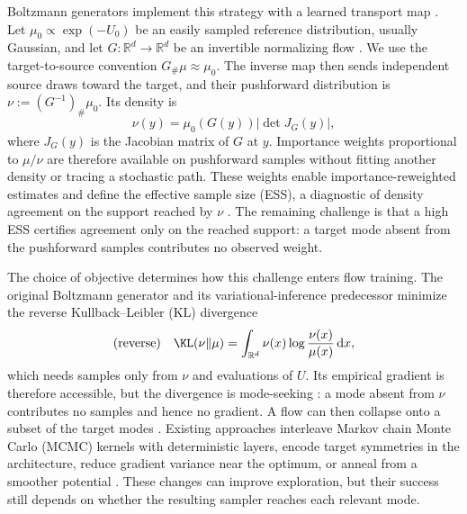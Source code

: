 \documentclass{article}
\begin{document}
Boltzmann generators implement this strategy with a learned transport map \citep{noe2019boltzmann}. Let $\mu_0\propto\exp(-U_0)$ be an easily sampled reference distribution, usually Gaussian, and let $G:\mathbb R^d\to\mathbb R^d$ be an invertible normalizing flow \citep{rezende2015variational,papamakarios2017masked,kingma2018glow}. We use the target-to-source convention $G_{\#}\mu\approx\mu_0$. The inverse map then sends independent source draws toward the target, and their pushforward distribution is $\nu:=(G^{-1})_{\#}\mu_0$. Its density is
\begin{equation}
    \nu(y)=\mu_0(G(y))\left|\det J_G(y)\right|,
    \label{eq: pushforward-density}
\end{equation}
where $J_G(y)$ is the Jacobian matrix of $G$ at $y$. Importance weights proportional to $\mu/\nu$ are therefore available on pushforward samples without fitting another density or tracing a stochastic path. These weights enable importance-reweighted estimates and define the effective sample size (ESS), a diagnostic of density agreement on the support reached by $\nu$ \citep{liu2001monte,doucet2001introduction,martino2017rethinking}. The remaining challenge is that a high ESS certifies agreement only on the reached support: a target mode absent from the pushforward samples contributes no observed weight.

The choice of objective determines how this challenge enters flow training. The original Boltzmann generator \citep{noe2019boltzmann} and its variational-inference predecessor \citep{rezende2015variational} minimize the reverse Kullback--Leibler (KL) divergence
\begin{equation}
    \text{(reverse)}\quad \KL(\nu\|\mu) = \int_{\mathbb R^d} \nu(x) \log \frac{\nu(x)}{\mu(x)} \D x,
    \label{eq: reverse KL}
\end{equation}
which needs samples only from $\nu$ and evaluations of $U$. Its empirical gradient is therefore accessible, but the divergence is mode-seeking \citep{wainwright2008graphical}: a mode absent from $\nu$ contributes no samples and hence no gradient. A flow can then collapse onto a subset of the target modes \citep{wu2020stochastic,felardos2023designing}. Existing approaches interleave Markov chain Monte Carlo (MCMC) kernels with deterministic layers, encode target symmetries in the architecture, reduce gradient variance near the optimum, or anneal from a smoother potential \citep{wu2020stochastic,kohler2020equivariant,vaitl2022gradients,schopmans2025temperature}. These changes can improve exploration, but their success still depends on whether the resulting sampler reaches each relevant mode.
\end{document}
